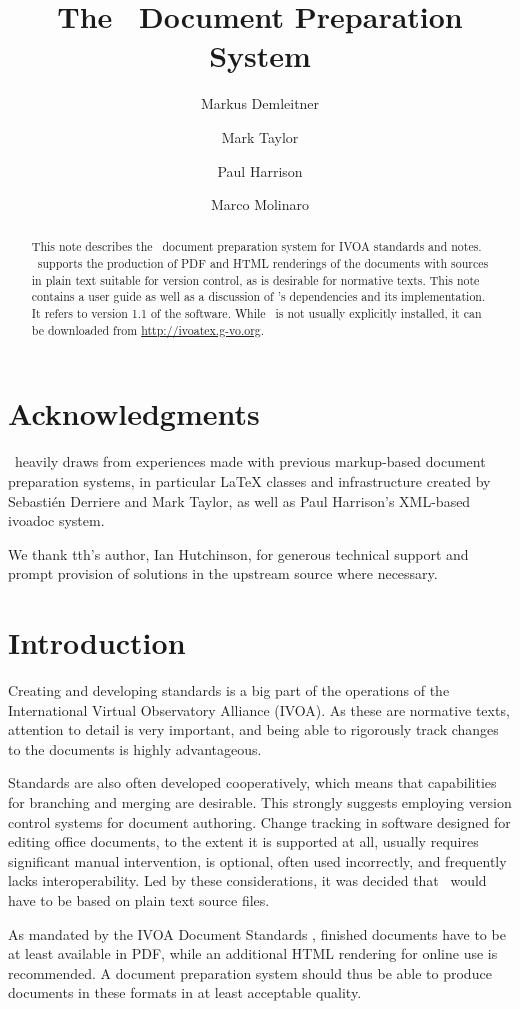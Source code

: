 \documentclass[11pt,a4paper]{ivoa}
\title{The \ivoatex\ Document Preparation System}
\author[http://www.ivoa.net/cgi-bin/twiki/bin/view/IVOA/MarkusDemleitner]{Markus Demleitner}
\author[http://www.ivoa.net/cgi-bin/twiki/bin/view/IVOA/MarkTaylor]{Mark Taylor}
\author[http://www.ivoa.net/cgi-bin/twiki/bin/view/IVOA/PaulHarrison]{Paul Harrison}
\author[http://www.ivoa.net/cgi-bin/twiki/bin/view/IVOA/MarcoMolinaro]{Marco Molinaro}
\begin{document}
\begin{abstract}
This note describes the \ivoatex\ document preparation system for IVOA
standards and notes.  \ivoatex\ supports the production of
PDF and HTML renderings of the documents with sources in
plain text suitable for version control, as is desirable for normative
texts.  This note contains a user guide as well as a discussion of 
\ivoatex's dependencies and its implementation.  It refers to version
1.1 of the software.  While \ivoatex~is not usually explicitly
installed, it can be downloaded from \url{http://ivoatex.g-vo.org}.
\end{abstract}


\section*{Acknowledgments}

\ivoatex\ heavily draws from experiences made with previous markup-based
document preparation systems, in particular LaTeX classes and
infrastructure created by Sebasti\'en Derriere and Mark Taylor, as well
as Paul Harrison's XML-based ivoadoc system.

We thank tth's author, Ian Hutchinson, for generous technical support
and prompt provision of solutions in the upstream source where necessary.

\section{Introduction}

Creating and developing standards is a  big part of the operations of
the International Virtual Observatory Alliance (IVOA).
As these are normative texts, attention to detail is very important, and
being able to rigorously track changes to the documents is highly
advantageous.  

Standards are also often developed cooperatively, which means that
capabilities for branching and merging are desirable.  This strongly
suggests employing version control systems for document authoring.
Change tracking in software designed for editing office documents, to
the extent it is supported at all, usually requires significant
manual intervention, is optional, often used incorrectly, and frequently
lacks interoperability.  Led by these considerations, it was decided that
\ivoatex\ would have to be based on plain text source files.

As mandated by the IVOA Document Standards \citep{2017ivoa.spec.0517G},
finished documents have to be at
least available in PDF, while an additional HTML rendering for online
use is recommended.  A document preparation system should thus be
able  to produce documents in these formats in at least acceptable
quality.
\end{document}

